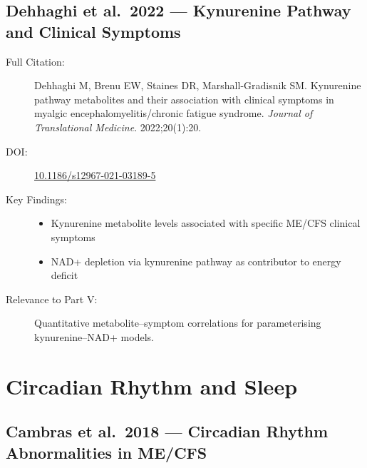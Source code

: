 \subsection{Dehhaghi et al.\ 2022 --- Kynurenine Pathway and Clinical Symptoms}

\begin{description}
    \item[Full Citation:] Dehhaghi M, Brenu EW, Staines DR, Marshall-Gradisnik SM. Kynurenine pathway metabolites and their association with clinical symptoms in myalgic encephalomyelitis/chronic fatigue syndrome. \textit{Journal of Translational Medicine}. 2022;20(1):20. \cite{Dehhaghi2022kynurenine}
    \item[DOI:] \href{https://doi.org/10.1186/s12967-021-03189-5}{10.1186/s12967-021-03189-5}
    \item[Key Findings:]
    \begin{itemize}
        \item Kynurenine metabolite levels associated with specific ME/CFS clinical symptoms
        \item NAD+ depletion via kynurenine pathway as contributor to energy deficit
    \end{itemize}
    \item[Relevance to Part V:] Quantitative metabolite--symptom correlations for parameterising kynurenine--NAD+ models.
\end{description}

\section{Circadian Rhythm and Sleep}
\label{sec:bib-circadian-sleep}

\subsection{Cambras et al.\ 2018 --- Circadian Rhythm Abnormalities in ME/CFS}


